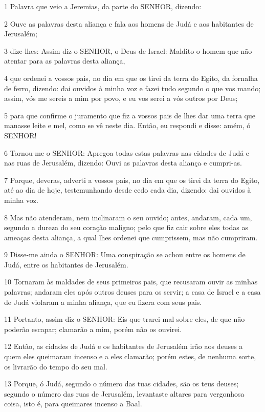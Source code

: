 \par 1 Palavra que veio a Jeremias, da parte do SENHOR, dizendo:
\par 2 Ouve as palavras desta aliança e fala aos homens de Judá e aos habitantes de Jerusalém;
\par 3 dize-lhes: Assim diz o SENHOR, o Deus de Israel: Maldito o homem que não atentar para as palavras desta aliança,
\par 4 que ordenei a vossos pais, no dia em que os tirei da terra do Egito, da fornalha de ferro, dizendo: dai ouvidos à minha voz e fazei tudo segundo o que vos mando; assim, vós me sereis a mim por povo, e eu vos serei a vós outros por Deus;
\par 5 para que confirme o juramento que fiz a vossos pais de lhes dar uma terra que manasse leite e mel, como se vê neste dia. Então, eu respondi e disse: amém, ó SENHOR!
\par 6 Tornou-me o SENHOR: Apregoa todas estas palavras nas cidades de Judá e nas ruas de Jerusalém, dizendo: Ouvi as palavras desta aliança e cumpri-as.
\par 7 Porque, deveras, adverti a vossos pais, no dia em que os tirei da terra do Egito, até ao dia de hoje, testemunhando desde cedo cada dia, dizendo: dai ouvidos à minha voz.
\par 8 Mas não atenderam, nem inclinaram o seu ouvido; antes, andaram, cada um, segundo a dureza do seu coração maligno; pelo que fiz cair sobre eles todas as ameaças desta aliança, a qual lhes ordenei que cumprissem, mas não cumpriram.
\par 9 Disse-me ainda o SENHOR: Uma conspiração se achou entre os homens de Judá, entre os habitantes de Jerusalém.
\par 10 Tornaram às maldades de seus primeiros pais, que recusaram ouvir as minhas palavras; andaram eles após outros deuses para os servir; a casa de Israel e a casa de Judá violaram a minha aliança, que eu fizera com seus pais.
\par 11 Portanto, assim diz o SENHOR: Eis que trarei mal sobre eles, de que não poderão escapar; clamarão a mim, porém não os ouvirei.
\par 12 Então, as cidades de Judá e os habitantes de Jerusalém irão aos deuses a quem eles queimaram incenso e a eles clamarão; porém estes, de nenhuma sorte, os livrarão do tempo do seu mal.
\par 13 Porque, ó Judá, segundo o número das tuas cidades, são os teus deuses; segundo o número das ruas de Jerusalém, levantaste altares para vergonhosa coisa, isto é, para queimares incenso a Baal.
